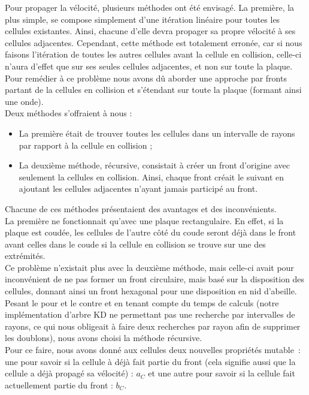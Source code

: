 \documentclass[a4paper,11pt]{article}
\begin{document}
Pour propager la vélocité, plusieurs méthodes ont été envisagé.
La première, la plus simple, se compose simplement d'une itération linéaire pour toutes les cellules existantes.
Ainsi, chacune d'elle devra propager sa propre vélocité à ses cellules adjacentes.
Cependant, cette méthode est totalement erronée, car si nous faisons l'itération de toutes les autres cellules avant la cellule en collision, celle-ci n'aura d'effet que sur ses seules cellules adjacentes, et non sur toute la plaque.\\
Pour remédier à ce problème nous avons dû aborder une approche par fronts partant de la cellules en collision et s'étendant sur toute la plaque (formant ainsi une onde).\\
Deux méthodes s'offraient à nous :
\begin{itemize}
\item La première était de trouver toutes les cellules dans un intervalle de rayons par rapport à la cellule en collision ;
\item La deuxième méthode, récursive, consistait à créer un front d'origine avec seulement la cellules en collision. Ainsi, chaque front créait le suivant en ajoutant les cellules adjacentes n'ayant jamais participé au front.
\end{itemize}
Chacune de ces méthodes présentaient des avantages et des inconvénients.\\
La première ne fonctionnait qu'avec une plaque rectangulaire. En effet, si la plaque est coudée, les cellules de l'autre côté du coude seront déjà dans le front avant celles dans le coude si la cellule en collision se trouve sur une des extrémités.\\
Ce problème n'existait plus avec la deuxième méthode, mais celle-ci avait pour inconvénient de ne pas former un front circulaire, mais basé sur la disposition des cellules, donnant ainsi un front hexagonal pour une disposition en nid d'abeille. \\
Pesant le pour et le contre et en tenant compte du temps de calculs (notre implémentation d'arbre KD ne permettant pas une recherche par intervalles de rayons, ce qui nous obligeait à faire deux recherches par rayon afin de supprimer les doublons), nous avons choisi la méthode récursive.\\
\medbreak
Pour ce faire, nous avons donné aux cellules deux nouvelles propriétés mutable~: une pour savoir si la cellule à déjà fait partie du front (cela signifie aussi que la cellule a déjà propagé sa vélocité) : $a_C$ et une autre pour savoir si la cellule fait actuellement partie du front : $b_C$.\\
\end{document}
